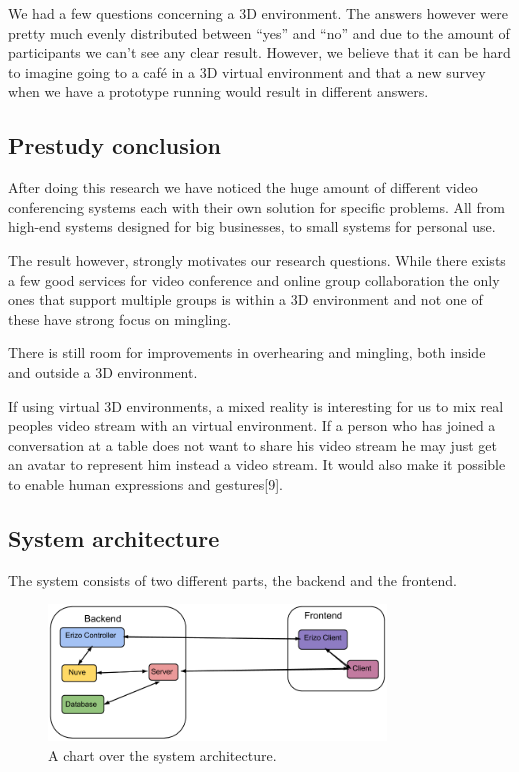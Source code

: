 \documentclass[12pt, titlepage]{article}
\begin{document}
We had a few questions concerning a 3D environment. The answers however were pretty much evenly distributed between “yes” and “no” and due to the amount of participants we can't see any clear result. However, we believe that it can be hard to imagine going to a café in a 3D virtual environment and that a new survey when we have a prototype running would result in different answers.
\subsection{Prestudy conclusion}
After doing this research we have noticed the huge amount of different video conferencing systems each with their own solution for specific problems. All from high-end systems designed for big businesses, to small systems for personal use.

The result however, strongly motivates our research questions. While there exists a few good services for video conference and online group collaboration the only ones that support multiple groups is within a 3D environment and not one of these have strong focus on mingling.

There is still room for improvements in overhearing and mingling, both inside and outside a 3D environment.

If using virtual 3D environments, a mixed reality is interesting for us to mix real peoples video stream with an virtual environment. If a person who has joined a conversation at a table does not want to share his video stream he may just get an avatar to represent him instead a video stream. It would also make it possible to enable human expressions and gestures[9].
\subsection{System architecture}
The system consists of two different parts, the backend and the frontend.
\begin{figure}[H]
  \centering
	\includegraphics[width=0.8\textwidth,keepaspectratio]{systemarchitecture.png}
  \caption{A chart over the system architecture.}
\end{figure}
\end{document}
